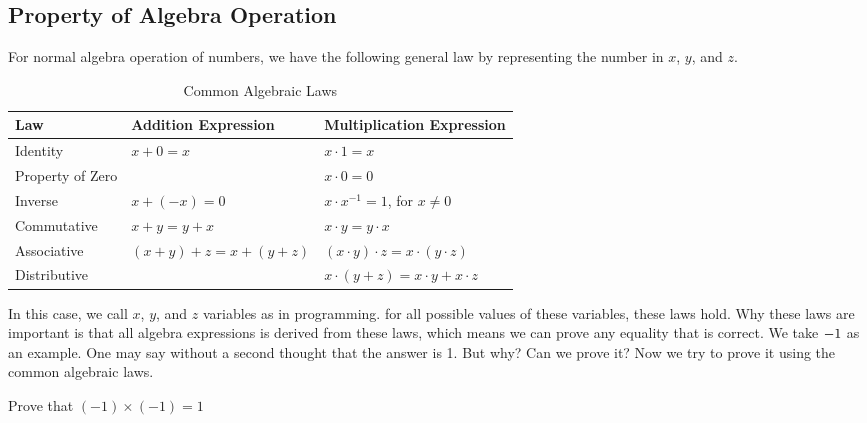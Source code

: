     \subsection{Property of Algebra Operation}
        For normal algebra operation of numbers, we have the following general law
        by representing the number in $x$, $y$, and $z$.
        \begin{table}[ht]
            \label{algelaw}
            \centering
            \caption{Common Algebraic Laws}
            \begin{tabular}{lll}
            \toprule
            \textbf{Law} & \textbf{Addition Expression} & \textbf{Multiplication Expression} \\
            \midrule
            Identity & \( x + 0 = x \) & \( x \cdot 1 = x \) \\
            Property of Zero & & \( x \cdot 0 = 0 \) \\
            Inverse & \( x + (-x) = 0 \) & \( x \cdot x^{-1} = 1 \), for \( x \neq 0 \) \\
            Commutative & \( x + y = y + x \) & \( x \cdot y = y \cdot x \) \\
            Associative & \( (x + y) + z = x + (y + z) \) & \( (x \cdot y) \cdot z = x \cdot (y \cdot z) \) \\
            Distributive & &\( x \cdot (y + z) = x \cdot y + x \cdot z \) \\
            \bottomrule
            \end{tabular}
        \end{table}
        In this case, we call $x$, $y$, and $z$ variables as in programming. for 
        all possible values of these variables, these laws hold.
        Why these laws are important is that all algebra expressions is derived
        from these laws, which means we can prove any equality that is correct.
        We take $-1 \time -1$ as an example. One may say without a second thought that
        the answer is 1. But why? Can we prove it? Now we try to prove it using the
        common algebraic laws.
        \begin{example}
            Prove that $(-1)\times (-1) = 1$
        \end{example}
